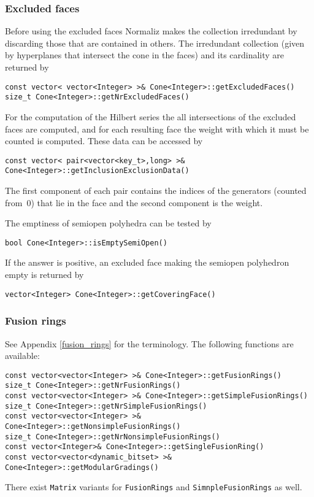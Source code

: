 \begin{small}
\subsubsection{Excluded faces}

Before using the excluded faces Normaliz makes the collection irredundant by discarding those that are contained in others. The irredundant collection (given by hyperplanes that intersect the cone in the faces) and its cardinality are returned by
\begin{Verbatim}
const vector< vector<Integer> >& Cone<Integer>::getExcludedFaces()
size_t Cone<Integer>::getNrExcludedFaces()
\end{Verbatim}
For the computation of the Hilbert series the all intersections of the excluded faces are computed, and for each resulting face the weight with which it must be counted is computed. These data can be accessed by
\begin{Verbatim}
const vector< pair<vector<key_t>,long> >& Cone<Integer>::getInclusionExclusionData()
\end{Verbatim}
The first component of each pair contains the indices of the generators (counted from~$0$) that lie in the face and the second component is the weight.

The emptiness of semiopen polyhedra can be tested by
\begin{Verbatim}
bool Cone<Integer>::isEmptySemiOpen()
\end{Verbatim}
If the answer is positive, an excluded face making the semiopen polyhedron empty is returned by
\begin{Verbatim}
vector<Integer> Cone<Integer>::getCoveringFace() 
\end{Verbatim}

\subsubsection{Fusion rings}\label{lib_fusion}

See Appendix \ref{fusion_rings}  for the terminology. The following functions are available:
\begin{Verbatim}
const vector<vector<Integer> >& Cone<Integer>::getFusionRings()
size_t Cone<Integer>::getNrFusionRings() 
const vector<vector<Integer> >& Cone<Integer>::getSimpleFusionRings()
size_t Cone<Integer>::getNrSimpleFusionRings()
const vector<vector<Integer> >& Cone<Integer>::getNonsimpleFusionRings()
size_t Cone<Integer>::getNrNonsimpleFusionRings()
const vector<Integer>& Cone<Integer>::getSingleFusionRing()
const vector<vector<dynamic_bitset> >& Cone<Integer>::getModularGradings()
\end{Verbatim}
There exist \verb*|Matrix| variants for \verb*|FusionRings| and \verb*|SimnpleFusionRings| as well.


\end{small}
